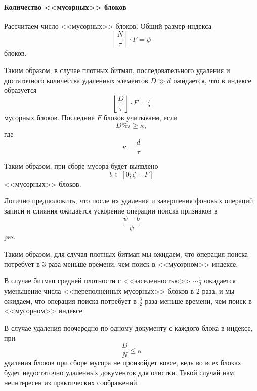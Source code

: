 \paragraph{Количество <<мусорных>> блоков}

Рассчитаем число <<мусорных>> блоков. Общий размер индекса
\begin{equation}
    \left\lceil\frac{N}{\tau}\right\rceil \cdot F = \psi
\end{equation}
блоков.

Таким образом, в случае плотных битмап, последовательного удаления и достаточного
количества удаленных элементов $D \gg d$ ожидается, что в индексе образуется
\begin{equation}
    \left\lfloor\frac{D}{\tau}\right\rfloor \cdot F = \zeta
\end{equation}
мусорных блоков. Последние $F$ блоков учитываем, если 
\begin{equation}
    D \% \tau \geq \kappa,
\end{equation}
где
\begin{equation}
    \kappa = \frac{d}{\tau}
\end{equation}

Таким образом, при сборе мусора будет выявлено
\begin{equation}
    b \in \left[0;\zeta + F\right]
\end{equation}
<<мусорных>> блоков.

Логично предположить, что после их удаления и завершения фоновых операций
записи и слияния ожидается ускорение операции поиска признаков в 
\begin{equation}
    \frac{\psi - b}{\psi}
\end{equation}
раз.

Таким образом, для случая плотных битмап мы ожидаем, что операция поиска потребует
в 3 раза меньше времени, чем поиск в <<мусорном>> индексе.

В случае битмап средней плотности с <<заселенностью>> $\sim\frac{1}{2}$ ожидается
уменьшение числа <<переполненных мусорных>> блоков в 2 раза, и мы
ожидаем, что операция поиска потребует в $\frac{3}{2}$ раза меньше времени, чем поиск в
<<мусорном>> индексе.

В случае удаления поочередно по одному документу с каждого блока в индексе, при
\begin{equation}
    \frac{D}{N} \leq \kappa
\end{equation}
удаления блоков при сборе мусора не произойдет вовсе, ведь во всех блоках будет
недостаточно удаленных документов для очистки. Такой случай нам неинтересен из
практических соображений.

